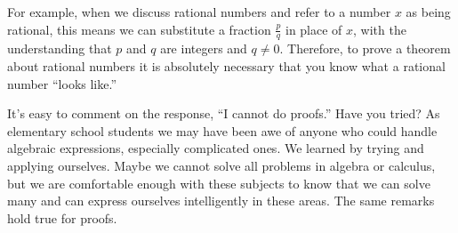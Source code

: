 \documentclass[10pt,]{book}
\theoremstyle{plain}
\theoremstyle{definition}
\theoremstyle{definition}
\theoremstyle{definition}
\theoremstyle{definition}
\begin{document}
%
\par
For example, when we discuss rational numbers and refer to a number \(x\) as being rational, this means we can substitute a fraction \(\frac{p}{q}\) in place of \(x\), with the understanding that \(p\) and \(q\) are integers and \(q\neq 0\). Therefore, to prove a theorem about rational numbers it is absolutely necessary that you know what a rational number ``looks like.''%
\par
It's easy to comment on the response, ``I cannot do proofs.''  Have you tried? As elementary school students we may have been awe of anyone who could handle algebraic expressions, especially complicated ones. We learned by trying and applying ourselves. Maybe we cannot solve all problems in algebra or calculus, but we are comfortable enough with these subjects to know that we can solve many and can express ourselves intelligently in these areas. The same remarks hold true for proofs.%
\typeout{************************************************}
\typeout{************************************************}
\end{document}
